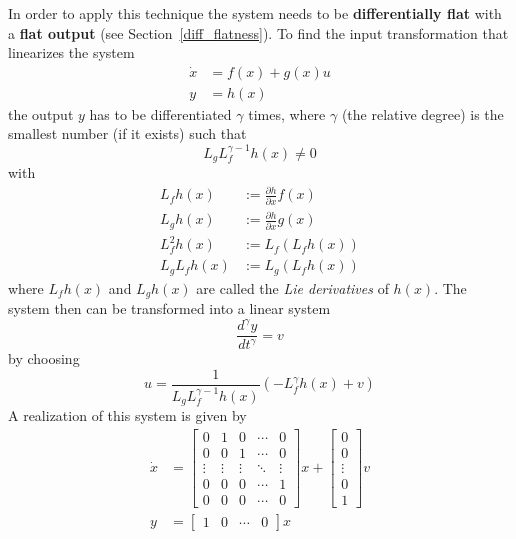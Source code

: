 In order to apply this technique the system needs to be \textbf{differentially flat} with a \textbf{flat output} (see Section~\ref{diff_flatness}).
\newpar{}
To find the input transformation that linearizes the system
\begin{align*}
    \dot{x} & = f(x) + g(x) u \\
    y       & = h(x)
\end{align*}
the output $y$ has to be differentiated $\gamma$ times, where $\gamma$ (the relative degree) is the smallest number (if it exists) such that
\begin{equation*}
    L_g L_f^{\gamma-1} h(x) \ne 0
\end{equation*}
with
\begin{align*}
    L_f h(x)     & := \frac{\partial h}{\partial x}f(x) \\
    L_g h(x)     & := \frac{\partial h}{\partial x}g(x) \\
    L_f^2 h(x)   & := L_f(L_f h(x))                     \\
    L_g L_f h(x) & := L_g (L_f h(x))
\end{align*}
where $L_f h(x)$ and $L_g h(x)$ are called the \textit{Lie derivatives} of $h(x)$.
\newpar{}
The system then can be transformed into a linear system
\begin{equation*}
    \frac{d^\gamma y}{dt^\gamma} = v
\end{equation*}
by choosing
\begin{equation*}
    u = \frac{1}{L_g L_f^{\gamma-1} h(x)}(-L_f^\gamma h(x) + v)
\end{equation*}
A realization of this system is given by
\begin{align*}
    \dot{x} & = \begin{bmatrix}
                    0      & 1      & 0      & \cdots & 0      \\
                    0      & 0      & 1      & \cdots & 0      \\
                    \vdots & \vdots & \vdots & \ddots & \vdots \\
                    0      & 0      & 0      & \cdots & 1      \\
                    0      & 0      & 0      & \cdots & 0
                \end{bmatrix}
    x +
    \begin{bmatrix}
        0      \\
        0      \\
        \vdots \\
        0      \\
        1
    \end{bmatrix}
    v                                                      \\
    y       & = \begin{bmatrix}
                    1 & 0 & \cdots & 0
                \end{bmatrix}
    x
\end{align*}

